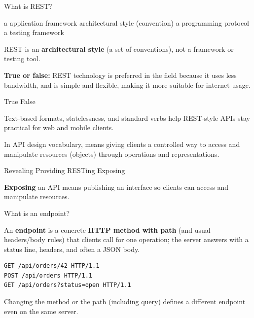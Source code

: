 \question[4]
What is REST?
\begin{choices}
  \choice a application framework
  \CorrectChoice architectural style (convention)
  \choice a programming protocol
  \choice a testing framework
\end{choices}
\begin{solution}
  REST is an \textbf{architectural style} (a set of conventions), not a framework or testing tool.
\end{solution}

\question[4]
\textbf{True or false:} REST technology is preferred in the field because it uses less bandwidth, and is simple and flexible, making it more suitable for internet usage.
\begin{choices}
  \CorrectChoice True
  \choice False
\end{choices}
\begin{solution}
  Text-based formats, statelessness, and standard verbs help REST-style APIs stay practical for web and mobile clients.
\end{solution}

\question[4]
In API design vocabulary, \blank[7em] means giving clients a controlled way to access and manipulate resources (objects) through operations and representations.
\begin{choices}
  \choice Revealing
  \choice Providing
  \choice RESTing
  \CorrectChoice Exposing
\end{choices}
\begin{solution}
  \textbf{Exposing} an API means publishing an interface so clients can access and manipulate resources.
\end{solution}




\question[4]
What is an endpoint?
\begin{solutionorbox}[1.00in]
  An \textbf{endpoint} is a concrete \textbf{HTTP method with path} (and usual headers/body rules) that clients call for one operation; the server answers with a status line, headers, and often a JSON body.
  \begin{lstlisting}[style=http]
GET /api/orders/42 HTTP/1.1
POST /api/orders HTTP/1.1
GET /api/orders?status=open HTTP/1.1
  \end{lstlisting}
  Changing the method or the path (including query) defines a different endpoint even on the same server.
\end{solutionorbox}



